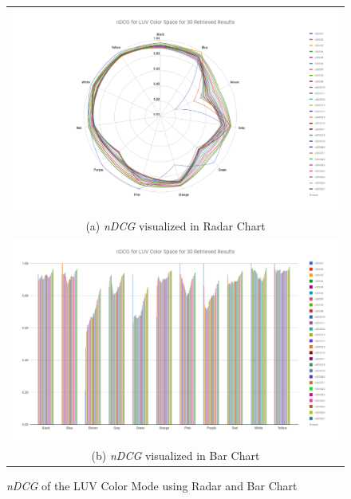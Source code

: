 \begin{figure}[htb!]
  \centering
\begin{tabular}{c}
 \includegraphics[width=0.9\linewidth]{image/retrievalTwo/radar_ndcg_luv.png}\\
 (a) \textit{nDCG} visualized in Radar Chart \\
  \includegraphics[width=0.9\linewidth]{image/retrievalTwo/bar_ndcg_luv.png}\\
 (b) \textit{nDCG} visualized in Bar Chart \\
\end{tabular}
\caption{\textit{nDCG} of the LUV Color Mode using Radar and Bar Chart} \label{fig:colorndcg}
\end{figure}


